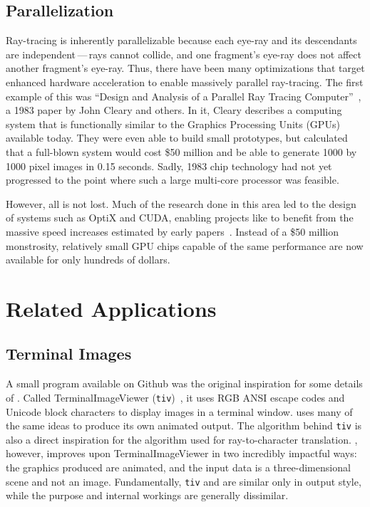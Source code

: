 \subsection{Parallelization}

Ray-tracing is inherently parallelizable because each eye-ray and its descendants are independent\,---\,rays cannot collide, and one fragment's eye-ray does not affect another fragment's eye-ray.
Thus, there have been many optimizations that target enhanced hardware acceleration to enable massively parallel ray-tracing.
The first example of this was ``Design and Analysis of a Parallel Ray Tracing Computer''~\cite{cleary1983design}, a 1983 paper by John Cleary and others.
In it, Cleary describes a computing system that is functionally similar to the Graphics Processing Units (GPUs) available today.
They were even able to build small prototypes, but calculated that a full-blown system would cost \$50 million and be able to generate 1000 by 1000 pixel images in 0.15 seconds.
Sadly, 1983 chip technology had not yet progressed to the point where such a large multi-core processor was feasible.

However, all is not lost.
Much of the research done in this area led to the design of systems such as OptiX and CUDA, enabling projects like \name{} to benefit from the massive speed increases estimated by early papers~\cite{parker2010optix, nvidia2011cuda, whitted2018explains}.
Instead of a \$50 million monstrosity, relatively small GPU chips capable of the same performance are now available for only hundreds of dollars.

\section{Related Applications}

\subsection{Terminal Images}

A small program available on Github was the original inspiration for some details of \name{}.
Called TerminalImageViewer (\texttt{tiv})~\cite{tivGithub}, it uses RGB ANSI escape codes and Unicode block characters to display images in a terminal window.
 \name{} uses many of the same ideas to produce its own animated output.
The algorithm behind \texttt{tiv} is also a direct inspiration for the algorithm used for ray-to-character translation.
 \name{}, however, improves upon TerminalImageViewer in two incredibly impactful ways: the graphics produced are animated, and the input data is a three-dimensional scene and not an image.
Fundamentally, \texttt{tiv} and \name{} are similar only in output style, while the purpose and internal workings are generally dissimilar.

